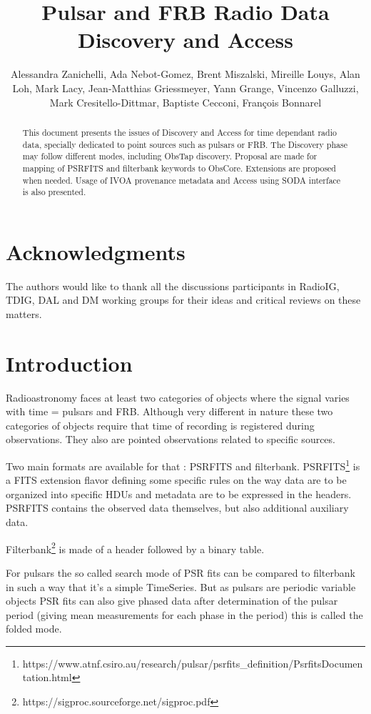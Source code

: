 \documentclass[11pt,a4paper]{ivoa}
\title{Pulsar and FRB Radio Data Discovery and Access}
\author{Alessandra Zanichelli, Ada Nebot-Gomez, Brent Miszalski, Mireille Louys, Alan Loh, Mark Lacy, Jean-Matthias Griessmeyer, Yann Grange, Vincenzo Galluzzi, Mark Cresitello-Dittmar, Baptiste Cecconi,  Fran\c cois Bonnarel}
\begin{document}
\begin{abstract}
This document presents the issues of  Discovery and Access for time dependant radio data, specially dedicated to point sources such as pulsars or FRB. The Discovery phase may follow  different modes, including ObsTap discovery. Proposal are made for mapping of PSRFITS and filterbank keywords to ObsCore. Extensions are proposed when needed. Usage of IVOA provenance metadata and Access using SODA interface is also presented.   


\end{abstract}

\section*{Acknowledgments}
The authors would like to thank all the discussions participants in RadioIG, TDIG, DAL and DM working groups for their ideas and critical reviews on these matters. 
\section{Introduction}

         Radioastronomy faces at least two categories of objects where the signal varies with time = pulsars and FRB.      
      Although very different in nature these two categories of objects require that time of recording is registered during observations. They also are pointed observations related to specific sources.
      
      Two main formats are available for that : PSRFITS and filterbank. PSRFITS\footnote{https://www.atnf.csiro.au/research/pulsar/psrfits\_definition/PsrfitsDocumentation.html} is a FITS extension flavor defining some specific rules on the way data are to be organized into specific HDUs and metadata are to be expressed in the headers.   PSRFITS contains the observed data themselves,  but also additional auxiliary data.
      
      
       Filterbank\footnote{https://sigproc.sourceforge.net/sigproc.pdf} is made of a header followed by a binary table. 
       
      
       
       For pulsars the so called search mode of PSR fits can be compared to filterbank in such a way that it's a simple TimeSeries. 
       But as pulsars are periodic variable objects PSR fits can also give phased data  after determination of the pulsar period (giving mean measurements for each phase in the period) this is called the folded mode. 
\end{document}
